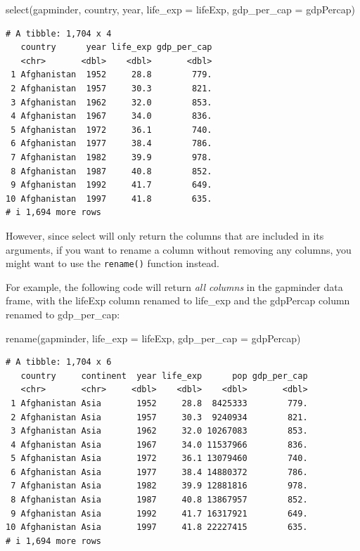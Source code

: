\documentclass[
  letterpaper,
  DIV=11,
  numbers=noendperiod]{scrreprt}
\newenvironment{Shaded}{\begin{snugshade}}{\end{snugshade}}
\newcommand{\AttributeTok}[1]{\textcolor[rgb]{0.40,0.45,0.13}{#1}}
\newcommand{\FunctionTok}[1]{\textcolor[rgb]{0.28,0.35,0.67}{#1}}
\newcommand{\NormalTok}[1]{\textcolor[rgb]{0.00,0.23,0.31}{#1}}
\begin{document}
\begin{Shaded}
\begin{Highlighting}[]
\FunctionTok{select}\NormalTok{(gapminder, country, year, }\AttributeTok{life\_exp =}\NormalTok{ lifeExp, }\AttributeTok{gdp\_per\_cap =}\NormalTok{ gdpPercap)}
\end{Highlighting}
\end{Shaded}

\begin{verbatim}
# A tibble: 1,704 x 4
   country      year life_exp gdp_per_cap
   <chr>       <dbl>    <dbl>       <dbl>
 1 Afghanistan  1952     28.8        779.
 2 Afghanistan  1957     30.3        821.
 3 Afghanistan  1962     32.0        853.
 4 Afghanistan  1967     34.0        836.
 5 Afghanistan  1972     36.1        740.
 6 Afghanistan  1977     38.4        786.
 7 Afghanistan  1982     39.9        978.
 8 Afghanistan  1987     40.8        852.
 9 Afghanistan  1992     41.7        649.
10 Afghanistan  1997     41.8        635.
# i 1,694 more rows
\end{verbatim}

However, since select will only return the columns that are included in
its arguments, if you want to rename a column without removing any
columns, you might want to use the \texttt{rename()} function instead.

For example, the following code will return \emph{all columns} in the
gapminder data frame, with the lifeExp column renamed to life\_exp and
the gdpPercap column renamed to gdp\_per\_cap:

\begin{Shaded}
\begin{Highlighting}[]
\FunctionTok{rename}\NormalTok{(gapminder, }\AttributeTok{life\_exp =}\NormalTok{ lifeExp, }\AttributeTok{gdp\_per\_cap =}\NormalTok{ gdpPercap)}
\end{Highlighting}
\end{Shaded}

\begin{verbatim}
# A tibble: 1,704 x 6
   country     continent  year life_exp      pop gdp_per_cap
   <chr>       <chr>     <dbl>    <dbl>    <dbl>       <dbl>
 1 Afghanistan Asia       1952     28.8  8425333        779.
 2 Afghanistan Asia       1957     30.3  9240934        821.
 3 Afghanistan Asia       1962     32.0 10267083        853.
 4 Afghanistan Asia       1967     34.0 11537966        836.
 5 Afghanistan Asia       1972     36.1 13079460        740.
 6 Afghanistan Asia       1977     38.4 14880372        786.
 7 Afghanistan Asia       1982     39.9 12881816        978.
 8 Afghanistan Asia       1987     40.8 13867957        852.
 9 Afghanistan Asia       1992     41.7 16317921        649.
10 Afghanistan Asia       1997     41.8 22227415        635.
# i 1,694 more rows
\end{verbatim}
\end{document}
